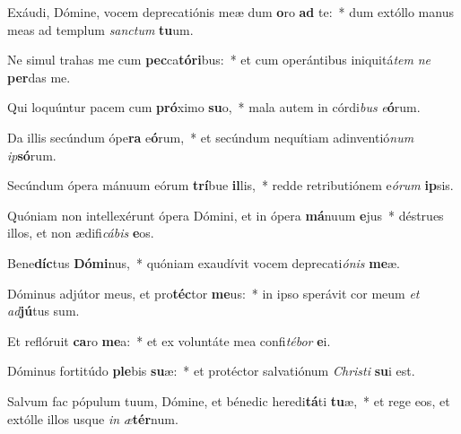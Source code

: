 \item Exáudi, Dómine, vocem deprecatiónis meæ dum \textbf{o}ro \textbf{ad} te:~* dum extóllo manus meas ad templum \textit{sanc}\textit{tum} \textbf{tu}um.
\item Ne simul trahas me cum \textbf{pec}ca\textbf{tó}\textbf{ri}bus:~* et cum operántibus iniquitá\textit{tem} \textit{ne} \textbf{per}das me.
\item Qui loquúntur pacem cum \textbf{pró}ximo \textbf{su}o,~* mala autem in córdi\textit{bus} \textit{e}\textbf{ó}rum.
\item Da illis secúndum ópe\textbf{ra} e\textbf{ó}rum,~* et secúndum nequítiam adinventió\textit{num} \textit{ip}\textbf{só}rum.
\item Secúndum ópera mánuum eórum \textbf{trí}bue \textbf{il}lis,~* redde retributiónem e\textit{ó}\textit{rum} \textbf{ip}sis.
\item Quóniam non intellexérunt ópera Dómini, et in ópera \textbf{má}nuum \textbf{e}jus~* déstrues illos, et non ædifi\textit{cá}\textit{bis} \textbf{e}os.
\item Bene\textbf{díc}tus \textbf{Dó}\textbf{mi}nus,~* quóniam exaudívit vocem deprecati\textit{ó}\textit{nis} \textbf{me}æ.
\item Dóminus adjútor meus, et pro\textbf{téc}tor \textbf{me}us:~* in ipso sperávit cor meum \textit{et} \textit{ad}\textbf{jú}tus sum.
\item Et reflóruit \textbf{ca}ro \textbf{me}a:~* et ex voluntáte mea confi\textit{té}\textit{bor} \textbf{e}i.
\item Dóminus fortitúdo \textbf{ple}bis \textbf{su}æ:~* et protéctor salvatiónum \textit{Chris}\textit{ti} \textbf{su}i est.
\item Salvum fac pópulum tuum, Dómine, et bénedic heredi\textbf{tá}ti \textbf{tu}æ,~* et rege eos, et extólle illos usque \textit{in} \textit{æ}\textbf{tér}num.
